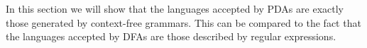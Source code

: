 

\setcounter{section}{6}
\setcounter{subsection}{4}
\setcounter{dfn}{9}

In this section we will show that the languages accepted by PDAs are exactly those generated by context-free grammars.
This can be compared to the fact that the languages accepted by DFAs are those described by regular expressions.



